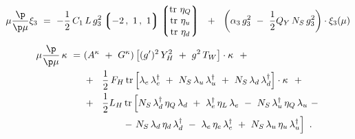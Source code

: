 %
\begin{equation}
\notag
	\mu \frac{\p}{\p\mu} 
	\xi_3 
	~=~
	- \frac{1}{2}\, C_1\, L\, g_3^2 
		\left\lgroup
			-2\,,~1\,,~1
		\right\rgroup
	\left\lgroup
	\begin{matrix}
		{\rm tr~}\eta_Q \\
		{\rm tr~}\eta_u \\
		{\rm tr~}\eta_d
	\end{matrix}
	\right\rgroup
	~~+~~
	\left(
		\alpha_3\, g_3^2 
		~-~
		\frac{1}{2}
		Q_Y\, N_S\, g_3^2
	\right)
	\cdot \xi_3 (\mu)
\end{equation}
%
\begin{align}
\notag
	\mu \frac{\p}{\p\mu} \,
	\kappa 
	~=~&
	( A^\kappa ~+~ G^\kappa )
	\left[
		(g')^2\, Y_H^2 ~+~ g^2\, T_W
	\right] \cdot \kappa
	~~+ 
	\\
\notag
	&
	+~~
	\frac{1}{2}\, F_H\, 
	{\rm tr} 
	\left[
		\lambda_e\, \lambda_e^\dag
		~+~
		N_S\, \lambda_u\, \lambda_u^\dag
		~+~
		N_S\, \lambda_d\, \lambda_d^\dag
	\right]
	\cdot \kappa
	~~+
	\\
\notag
	&
	+~~
	\frac{1}{2}
	L_H\,
	{\rm tr} 
	\left[
		N_S\, \lambda_d^\dag\, \eta_Q\, \lambda_d 
		~+~
		\lambda_e^\dag\, \eta_L\, \lambda_e
		~-~
		N_S\, \lambda_u^\dag\, \eta_Q\, \lambda_u
		~-
	\right.
	\\
\notag
	&
	\qquad\qquad
	\left.
		-~
		N_S\, \lambda_d\, \eta_d\, \lambda_d^\dag
		~-~
		\lambda_e\, \eta_e\, \lambda_e^\dag
		~+~
		N_S\, \lambda_u\, \eta_u\, \lambda_u^\dag
	\right]
	~.
\end{align}


